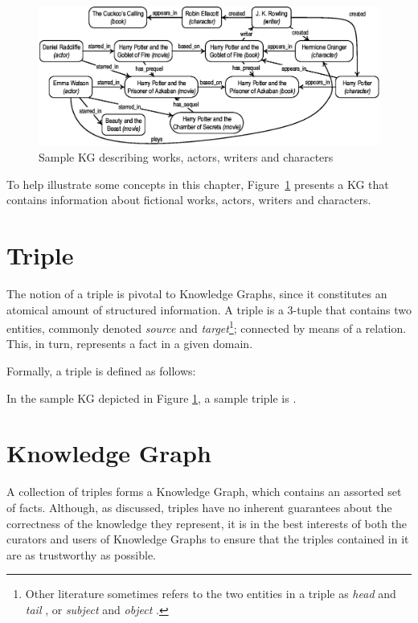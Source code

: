 \begin{figure}[htp]
    \centering
    \includegraphics[width=\textwidth]{fig/theoretical/kg-harry-potter}
    \caption{Sample KG describing works, actors, writers and characters}
    \label{fig:kg-potter}
\end{figure}

To help illustrate some concepts in this chapter, Figure~\ref{fig:kg-potter} presents a KG that contains information about fictional works, actors, writers and characters.

\section{Triple}\label{sec:theo-triple}
The notion of a triple is pivotal to Knowledge Graphs, since it constitutes an atomical amount of structured information. A triple is a 3-tuple that contains two entities, commonly denoted \textit{source} and \textit{target}\footnote{Other literature sometimes refers to the two entities in a triple as \textit{head} and \textit{tail} \cite{dessi2022cskg,dessi2020aikg,bordes2013}, or \textit{subject} and \textit{object} \cite{nickel2016, balazevic2019,trouillon2016}.}; connected by means of a relation. This, in turn, represents a fact in a given domain.

Formally, a triple is defined as follows:


In the sample KG depicted in Figure \ref{fig:kg-potter}, a sample triple is .


\section{Knowledge Graph}\label{sec:theo-kg}
A collection of triples forms a Knowledge Graph, which contains an assorted set of facts. Although, as discussed, triples have no inherent guarantees about the correctness of the knowledge they represent, it is in the best interests of both the curators and users of Knowledge Graphs to ensure that the triples contained in it are as trustworthy as possible.

